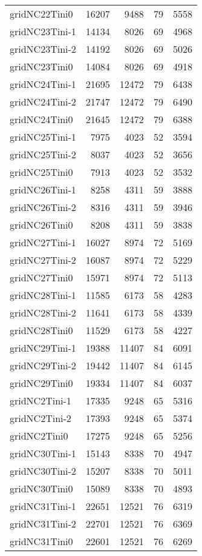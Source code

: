 \begin{longtable}{lrrrr}
gridNC22Tini0 & 16207 & 9488 & 79 & 5558 \\
gridNC23Tini-1 & 14134 & 8026 & 69 & 4968 \\
gridNC23Tini-2 & 14192 & 8026 & 69 & 5026 \\
gridNC23Tini0 & 14084 & 8026 & 69 & 4918 \\
gridNC24Tini-1 & 21695 & 12472 & 79 & 6438 \\
gridNC24Tini-2 & 21747 & 12472 & 79 & 6490 \\
gridNC24Tini0 & 21645 & 12472 & 79 & 6388 \\
gridNC25Tini-1 & 7975 & 4023 & 52 & 3594 \\
gridNC25Tini-2 & 8037 & 4023 & 52 & 3656 \\
gridNC25Tini0 & 7913 & 4023 & 52 & 3532 \\
gridNC26Tini-1 & 8258 & 4311 & 59 & 3888 \\
gridNC26Tini-2 & 8316 & 4311 & 59 & 3946 \\
gridNC26Tini0 & 8208 & 4311 & 59 & 3838 \\
gridNC27Tini-1 & 16027 & 8974 & 72 & 5169 \\
gridNC27Tini-2 & 16087 & 8974 & 72 & 5229 \\
gridNC27Tini0 & 15971 & 8974 & 72 & 5113 \\
gridNC28Tini-1 & 11585 & 6173 & 58 & 4283 \\
gridNC28Tini-2 & 11641 & 6173 & 58 & 4339 \\
gridNC28Tini0 & 11529 & 6173 & 58 & 4227 \\
gridNC29Tini-1 & 19388 & 11407 & 84 & 6091 \\
gridNC29Tini-2 & 19442 & 11407 & 84 & 6145 \\
gridNC29Tini0 & 19334 & 11407 & 84 & 6037 \\
gridNC2Tini-1 & 17335 & 9248 & 65 & 5316 \\
gridNC2Tini-2 & 17393 & 9248 & 65 & 5374 \\
gridNC2Tini0 & 17275 & 9248 & 65 & 5256 \\
gridNC30Tini-1 & 15143 & 8338 & 70 & 4947 \\
gridNC30Tini-2 & 15207 & 8338 & 70 & 5011 \\
gridNC30Tini0 & 15089 & 8338 & 70 & 4893 \\
gridNC31Tini-1 & 22651 & 12521 & 76 & 6319 \\
gridNC31Tini-2 & 22701 & 12521 & 76 & 6369 \\
gridNC31Tini0 & 22601 & 12521 & 76 & 6269 \\

\end{longtable}
